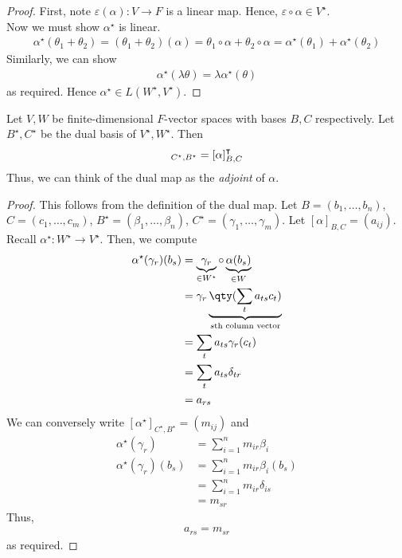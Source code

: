 \begin{proof}
	First, note $\varepsilon(\alpha) \colon V \to F$ is a linear map.
	Hence, $\varepsilon \circ \alpha \in V^\star$. \\
	Now we must show $\alpha^\star$ is linear.
	\begin{align*}
		\alpha^\star(\theta_1 + \theta_2) = (\theta_1 + \theta_2)(\alpha) = \theta_1 \circ \alpha + \theta_2 \circ \alpha = \alpha^\star(\theta_1) + \alpha^\star(\theta_2)
	\end{align*}
	Similarly, we can show
	\begin{align*}
		\alpha^\star(\lambda \theta) = \lambda \alpha^\star(\theta)
	\end{align*}
	as required.
	Hence $\alpha^\star \in L(W^\star, V^\star)$.
\end{proof}
\begin{proposition}
	Let $V, W$ be finite-dimensional $F$-vector spaces with bases $B, C$ respectively.
	Let $B^\star, C^\star$ be the dual basis of $V^\star, W^\star$.
	Then
	\begin{align*}
		[\alpha^\star]_{C^\star, B^\star} = [\alpha]^\transpose_{B, C}
	\end{align*}
	Thus, we can think of the dual map as the \textit{adjoint} of $\alpha$.
\end{proposition}
\begin{proof}
	This follows from the definition of the dual map.
	Let $B = (b_1, \dots, b_n)$, $C = (c_1, \dots, c_m)$, $B^\star = (\beta_1, \dots, \beta_n)$, $C^\star = (\gamma_1, \dots, \gamma_m)$.
	Let $[\alpha]_{B,C} = (a_{ij})$.
	Recall $\alpha^\star : W^\star \to V^\star$.
	Then, we compute
	\begin{align*}
		\alpha^\star(\gamma_r)(b_s) &= \underbrace{\gamma_r}_{\in W^\star} \circ \underbrace{\alpha(b_s)}_{\in W} \\
		&= \gamma_r \underbrace{\qty( \sum_t a_{ts} c_t )}_\text{$s$th column vector} \\
		&= \sum_t a_{ts} \gamma_r(c_t) \\
		&= \sum_t a_{ts} \delta_{tr} \\
		&= a_{rs}
	\end{align*}
	We can conversely write $[\alpha^\star]_{C^\star, B^\star} = (m_{ij})$ and
	\begin{align*}
		\alpha^\star(\gamma_r) &= \sum_{i=1}^n m_{ir} \beta_i \\
		\alpha^\star(\gamma_r)(b_s) &= \sum_{i=1}^n m_{ir} \beta_i(b_s) \\
		&= \sum_{i=1}^n m_{ir} \delta_{is} \\
		&= m_{sr}
	\end{align*}
	Thus,
	\begin{align*}
		a_{rs} = m_{sr}
	\end{align*}
	as required.
\end{proof}


